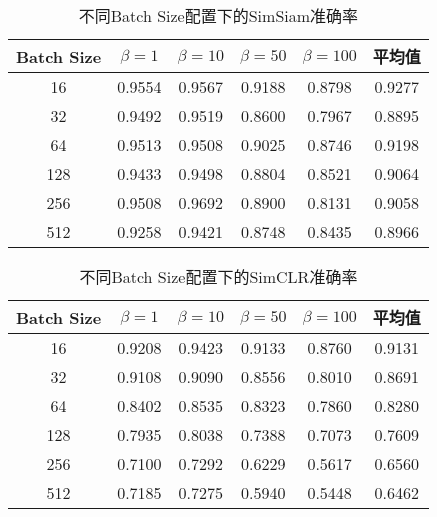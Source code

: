 \documentclass[master]{thesis-uestc}
\begin{document}
\begin{table}[h]
    \centering
    \caption{不同Batch Size配置下的SimSiam准确率}
    \begin{tabular}{cccccc}
    \hline
    \textbf{Batch Size} & \textbf{$\beta = 1$} & \textbf{$\beta = 10$} & \textbf{$\beta = 50$} & \textbf{$\beta = 100$} & \textbf{平均值} \\
    \hline
    16   & 0.9554 & 0.9567 & 0.9188 & 0.8798 & 0.9277 \\
    32   & 0.9492 & 0.9519 & 0.8600 & 0.7967 & 0.8895 \\
    64   & 0.9513 & 0.9508 & 0.9025 & 0.8746 & 0.9198 \\
    128  & 0.9433 & 0.9498 & 0.8804 & 0.8521 & 0.9064 \\
    256  & 0.9508 & 0.9692 & 0.8900 & 0.8131 & 0.9058 \\
    512  & 0.9258 & 0.9421 & 0.8748 & 0.8435 & 0.8966 \\
    \hline
    \end{tabular}
    \label{tab:batch_size_simsiam}
\end{table}

\begin{table}[h]
    \centering
    \caption{不同Batch Size配置下的SimCLR准确率}
    \begin{tabular}{cccccc}
    \hline
    \textbf{Batch Size} & \textbf{$\beta = 1$} & \textbf{$\beta = 10$} & \textbf{$\beta = 50$} & \textbf{$\beta = 100$} & \textbf{平均值} \\
    \hline
    16   & 0.9208 & 0.9423 & 0.9133 & 0.8760 & 0.9131 \\
    32   & 0.9108 & 0.9090 & 0.8556 & 0.8010 & 0.8691 \\
    64   & 0.8402 & 0.8535 & 0.8323 & 0.7860 & 0.8280 \\
    128  & 0.7935 & 0.8038 & 0.7388 & 0.7073 & 0.7609 \\
    256  & 0.7100 & 0.7292 & 0.6229 & 0.5617 & 0.6560 \\
    512  & 0.7185 & 0.7275 & 0.5940 & 0.5448 & 0.6462 \\
    \hline
    \end{tabular}
    \label{tab:batch_size_simclr_finetune}
\end{table}
\end{document}
